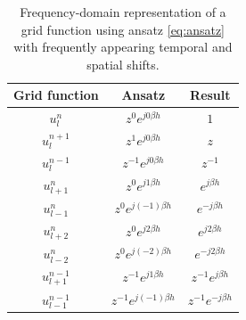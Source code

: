 {\renewcommand{\arraystretch}{1.2}

\begin{table}[h]
    \begin{center}
    \begin{tabular}{|c|c|c|}
        \hline
        Grid function & Ansatz & Result\\ \hline
        $u_l^n$ & $z^0 e^{j0\beta h}$ & $1$\\
        $u_l^{n+1}$ & $z^1 e^{j0\beta h}$ & $z$\\
        $u_l^{n-1}$ & $z^{-1} e^{j0\beta h}$ & $z^{-1}$\\
        $u_{l+1}^n$ & $z^0 e^{j1\beta h}$ & $e^{j\beta h}$\\
        $u_{l-1}^n$ & $z^0 e^{j(-1)\beta h}$ & $e^{-j\beta h}$\\
        $u_{l+2}^n$ & $z^0 e^{j2\beta h}$ & $e^{j2\beta h}$\\
        $u_{l-2}^n$ & $z^0 e^{j(-2)\beta h}$ & $e^{-j2\beta h}$\\
        $u_{l+1}^{n-1}$ & $z^{-1} e^{j1\beta h}$ & $z^{-1}e^{j\beta h}$\\
        $u_{l-1}^{n-1}$ & $z^{-1} e^{j(-1)\beta h}$ & $z^{-1}e^{-j\beta h}$\\\hline
    \end{tabular}
    \caption{Frequency-domain representation of a grid function using ansatz \eqref{eq:ansatz} with frequently appearing temporal and spatial shifts.\label{tab:zIdentities}}
    \end{center}
\end{table}
{\renewcommand{\arraystretch}{1}

}}
